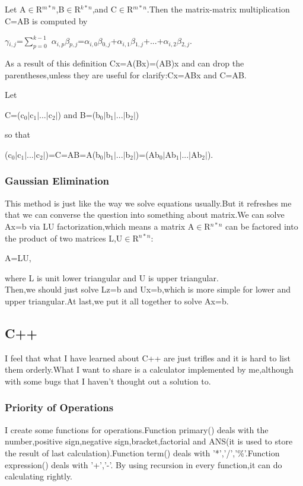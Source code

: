 \documentclass{article}
\begin{document}
Let A$\in$R$^{m*n}$,B$\in$R$^{k*n}$,and C$\in$R$^{m*n}$.Then the matrix-matrix multiplication C=AB is computed by
\begin{center}
   $\gamma$$_{i,j}$=$\sum_{p=0}^{k-1}$ $\alpha$$_{i,p}$$\beta$$_{p,j}$=$\alpha$$_{i,0}$$\beta$$_{0,j}$+$\alpha$$_{i,1}$$\beta$$_{1,j}$+...+$\alpha$$_{i,2}$$\beta$$_{2,j}$.
\end{center}
As a result of this definition Cx=A(Bx)=(AB)x and can drop the parentheses,unless they are useful for clarify:Cx=ABx and C=AB.

Let
\begin{center}
C=(c$_0$$\mid$c$_1$$\mid$...$\mid$c$_2$$\mid$) and B=(b$_0$$\mid$b$_1$$\mid$...$\mid$b$_2$$\mid$)
\end{center}
so that 
\begin{center}
(c$_0$$\mid$c$_1$$\mid$...$\mid$c$_2$$\mid$)=C=AB=A(b$_0$$\mid$b$_1$$\mid$...$\mid$b$_2$$\mid$)=(Ab$_0$$\mid$Ab$_1$$\mid$...$\mid$Ab$_2$$\mid$).
\end{center}

\subsubsection{Gaussian Elimination}
This method is just like the way we solve equations usually.But it refreshes me that we can converse the question into something about matrix.We can solve Ax=b via LU factorization,which means a matrix A$\in$R$^{n*n}$ can be factored into the product of two matrices L,U$\in$R$^{n*n}$:
\begin{center}
A=LU,
\end{center}
where L is unit lower triangular and U is upper triangular.\\
Then,we should just solve Lz=b and Ux=b,which is more simple for lower and upper triangular.At last,we put it all together to solve Ax=b.

\subsection{C++}
I feel that what I have learned about C++ are just trifles and it is hard to list them orderly.What I want to share is a calculator implemented by me,although with some bugs that I haven't thought out a solution to.

\subsubsection{Priority of Operations}
I create some functions for operations.Function primary() deals with the number,positive sign,negative sign,bracket,factorial and ANS(it is used to store the result of last calculation).Function term() deals with '*','/','\%'.Function expression() deals with '+','-'.
By using recursion in every function,it can do calculating rightly.
\end{document}
